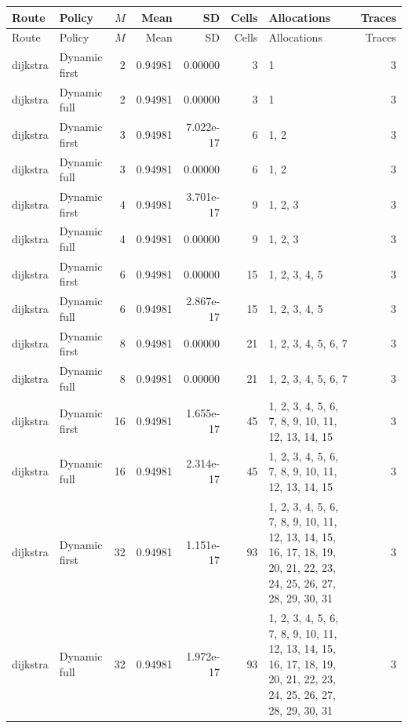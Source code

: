 \documentclass[10pt,a4paper]{article}
\begin{document}
\tiny\setlength{\tabcolsep}{2pt}\begin{longtable}{@{}p{23mm}p{29mm}rrrrp{36mm}r@{}}
\toprule Route & Policy & $M$ & Mean & SD & Cells & Allocations & Traces \\ \midrule\endfirsthead
\toprule Route & Policy & $M$ & Mean & SD & Cells & Allocations & Traces \\ \midrule\endhead
\bottomrule\endfoot
dijkstra & Dynamic first & 2 & 0.94981 & 0.00000 & 3 & 1 & 3 \\
dijkstra & Dynamic full & 2 & 0.94981 & 0.00000 & 3 & 1 & 3 \\
dijkstra & Dynamic first & 3 & 0.94981 & 7.022e-17 & 6 & 1, 2 & 3 \\
dijkstra & Dynamic full & 3 & 0.94981 & 0.00000 & 6 & 1, 2 & 3 \\
dijkstra & Dynamic first & 4 & 0.94981 & 3.701e-17 & 9 & 1, 2, 3 & 3 \\
dijkstra & Dynamic full & 4 & 0.94981 & 0.00000 & 9 & 1, 2, 3 & 3 \\
dijkstra & Dynamic first & 6 & 0.94981 & 0.00000 & 15 & 1, 2, 3, 4, 5 & 3 \\
dijkstra & Dynamic full & 6 & 0.94981 & 2.867e-17 & 15 & 1, 2, 3, 4, 5 & 3 \\
dijkstra & Dynamic first & 8 & 0.94981 & 0.00000 & 21 & 1, 2, 3, 4, 5, 6, 7 & 3 \\
dijkstra & Dynamic full & 8 & 0.94981 & 0.00000 & 21 & 1, 2, 3, 4, 5, 6, 7 & 3 \\
dijkstra & Dynamic first & 16 & 0.94981 & 1.655e-17 & 45 & 1, 2, 3, 4, 5, 6, 7, 8, 9, 10, 11, 12, 13, 14, 15 & 3 \\
dijkstra & Dynamic full & 16 & 0.94981 & 2.314e-17 & 45 & 1, 2, 3, 4, 5, 6, 7, 8, 9, 10, 11, 12, 13, 14, 15 & 3 \\
dijkstra & Dynamic first & 32 & 0.94981 & 1.151e-17 & 93 & 1, 2, 3, 4, 5, 6, 7, 8, 9, 10, 11, 12, 13, 14, 15, 16, 17, 18, 19, 20, 21, 22, 23, 24, 25, 26, 27, 28, 29, 30, 31 & 3 \\
dijkstra & Dynamic full & 32 & 0.94981 & 1.972e-17 & 93 & 1, 2, 3, 4, 5, 6, 7, 8, 9, 10, 11, 12, 13, 14, 15, 16, 17, 18, 19, 20, 21, 22, 23, 24, 25, 26, 27, 28, 29, 30, 31 & 3 \\
\end{longtable}\normalsize\setlength{\tabcolsep}{6pt}
\clearpage
\end{document}

